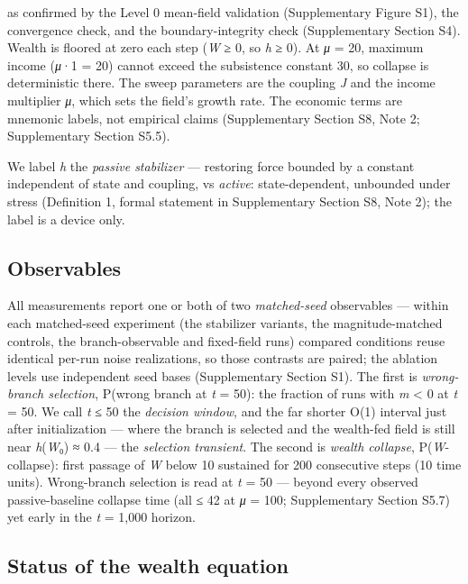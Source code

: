 \documentclass[11pt,letterpaper]{article}
\begin{document}
as confirmed by the Level 0 mean-field validation (Supplementary Figure S1), the convergence check, and the boundary-integrity check (Supplementary Section S4). Wealth is floored at zero each step (\emph{W} ≥ 0, so \emph{h} ≥ 0). At \emph{μ} = 20, maximum income (\emph{μ}·1 = 20) cannot exceed the subsistence constant 30, so collapse is deterministic there. The sweep parameters are the coupling \emph{J} and the income multiplier \emph{μ}, which sets the field's growth rate. The economic terms are mnemonic labels, not empirical claims (Supplementary Section S8, Note 2; Supplementary Section S5.5).

We label \emph{h} the \emph{passive stabilizer} --- restoring force bounded by a constant independent of state and coupling, vs \emph{active}: state-dependent, unbounded under stress (Definition 1, formal statement in Supplementary Section S8, Note 2); the label is a device only.

\subsection{Observables}\label{observables}

All measurements report one or both of two \emph{matched-seed} observables --- within each matched-seed experiment (the stabilizer variants, the magnitude-matched controls, the branch-observable and fixed-field runs) compared conditions reuse identical per-run noise realizations, so those contrasts are paired; the ablation levels use independent seed bases (Supplementary Section S1). The first is \emph{wrong-branch selection}, P(wrong branch at \emph{t} = 50): the fraction of runs with \emph{m} \textless{} 0 at \emph{t} = 50. We call \emph{t} ≤ 50 the \emph{decision window}, and the far shorter O(1) interval just after initialization --- where the branch is selected and the wealth-fed field is still near \emph{h}(\emph{W}₀) ≈ 0.4 --- the \emph{selection transient}. The second is \emph{wealth collapse}, P(\emph{W}-collapse): first passage of \emph{W} below 10 sustained for 200 consecutive steps (10 time units). Wrong-branch selection is read at \emph{t} = 50 --- beyond every observed passive-baseline collapse time (all ≤ 42 at \emph{μ} = 100; Supplementary Section S5.7) yet early in the \emph{t} = 1,000 horizon.

\subsection{Status of the wealth equation}\label{status-of-the-wealth-equation}
\end{document}
